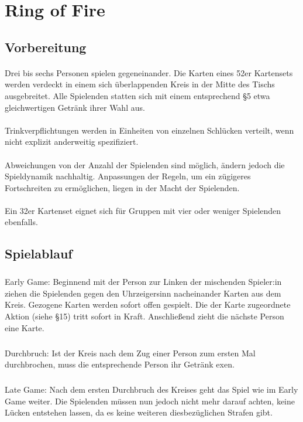 \section{Ring of Fire}
\subsection{Vorbereitung}
\paragraph{}
Drei bis sechs Personen spielen gegeneinander. Die Karten eines 52er Kartensets werden verdeckt in einem sich überlappenden Kreis in der Mitte des Tischs ausgebreitet. Alle Spielenden statten sich mit einem entsprechend §5 etwa gleichwertigen Getränk ihrer Wahl aus.

\paragraph{}
Trinkverpflichtungen werden in Einheiten von einzelnen Schlücken verteilt, wenn nicht explizit anderweitig spezifiziert.

\paragraph{}
Abweichungen von der Anzahl der Spielenden sind möglich, ändern jedoch die Spieldynamik nachhaltig. Anpassungen der Regeln, um ein zügigeres Fortschreiten zu ermöglichen, liegen in der Macht der Spielenden.

\paragraph{}
Ein 32er Kartenset eignet sich für Gruppen mit vier oder weniger Spielenden ebenfalls.


\subsection{Spielablauf}
\paragraph{}
\subparagraph{}
Early Game: Beginnend mit der Person zur Linken der mischenden Spieler:in ziehen die Spielenden gegen den Uhrzeigersinn nacheinander Karten aus dem Kreis. Gezogene Karten werden sofort offen gespielt. Die der Karte zugeordnete Aktion (siehe §15) tritt sofort in Kraft. Anschließend zieht die nächste Person eine Karte.
\subparagraph{}
Durchbruch: Ist der Kreis nach dem Zug einer Person zum ersten Mal durchbrochen, muss die entsprechende Person ihr Getränk exen.
\subparagraph{}
Late Game: Nach dem ersten Durchbruch des Kreises geht das Spiel wie im Early Game weiter. Die Spielenden müssen nun jedoch nicht mehr darauf achten, keine Lücken entstehen lassen, da es keine weiteren diesbezüglichen Strafen gibt.


